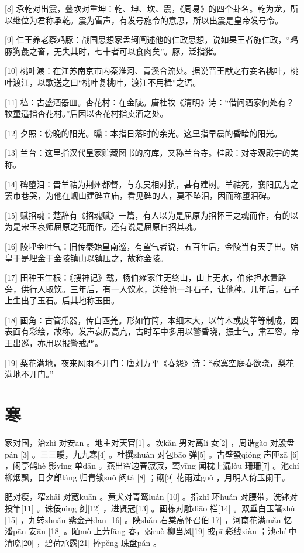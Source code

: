 \documentclass[12pt,UTF8]{ctexbook}
\begin{document}
[8] 承乾对出震，叠坎对重坤：乾、坤、坎、震，《周易》的四个卦名。乾为龙，所以继位为君称承乾。震为雷声，有发号施令的意思，所以出震是皇帝发号令。

[9] 仁王养老察鸡豚：战国思想家孟轲阐述他的仁政思想，说如果王者施仁政，“鸡豚狗彘之畜，无失其时，七十者可以食肉矣”。豚，泛指猪。

[10] 桃叶渡：在江苏南京市内秦淮河、青溪合流处。据说晋王献之有妾名桃叶，桃叶渡江，以歌送之曰“桃叶复桃叶，渡江不用楫”之语。

[11] 榼：古盛酒器皿。杏花村：在金陵。唐杜牧《清明》诗：“借问酒家何处有？牧童遥指杏花村。”后因以杏花村指卖酒之处。

[12] 夕照：傍晚的阳光。曛：本指日落时的余光。这里指早晨的昏暗的阳光。

[13] 兰台：这里指汉代皇家贮藏图书的府库，又称兰台寺。桂殿：对寺观殿宇的美称。

[14] 碑堕泪：晋羊祜为荆州都督，与东吴相对抗，甚有建树。羊祜死，襄阳民为之罢巿巷哭，为他在岘山建碑立庙，看见碑的人，莫不坠泪，因而称堕泪碑。

[15] 赋招魂：楚辞有《招魂赋》一篇，有人以为是屈原为招怀王之魂而作，有的以为是宋玉哀师屈原之死而作。还有说是屈原自招其魂。

[16] 陵埋金吐气：旧传秦始皇南巡，有望气者说，五百年后，金陵当有天子出。始皇于是埋金于金陵镇山以镇压之，故称金陵。

[17] 田种玉生根：《搜神记》载，杨伯雍家住无终山，山上无水，伯雍担水置路旁，供行人取饮。三年后，有一人饮水，送给他一斗石子，让他种。几年后，石子上生出了玉石。后其地称玉田。

[18] 画角：古管乐器，传自西羌。形如竹筒，本细末大，以竹木或皮革等制成，因表面有彩绘，故称。发声哀厉高亢，古时军中多用以警昏晓，振士气，肃军容。帝王出巡，亦用以报警戒严。

[19] 梨花满地，夜来风雨不开门：唐刘方平《春怨》诗：“寂寞空庭春欲晓，梨花满地不开门。”





\chapter{寒}


家对国，治zhì 对安ān 。地主对天官[1] 。坎kǎn 男对离lí 女[2] ，周诰gào 对殷盘pán [3] 。三三暖，九九寒[4] 。杜撰zhuàn 对包bāo 弹[5] 。古壁蛩qióng 声匝zā [6] ，闲亭鹤hè 影yǐng 单dān 。燕出帘边春寂寂，莺yīng 闻枕上漏lòu 珊珊[7] 。池chí 柳烟飘，日夕郎láng 归青锁suǒ 闼tà [8] ；砌[9] 花雨过guò ，月明人倚玉阑干。

肥对瘦，窄zhǎi 对宽kuān 。黄犬对青鸾luán [10] 。指zhǐ 环huán 对腰带，洗钵对投竿[11] 。诛佞nìng 剑[12] ，进贤冠[13] 。画栋对雕diāo 栏[14] 。双垂白玉箸zhù [15] ，九转zhuǎn 紫金丹dān [16] 。陕shǎn 右棠高怀召伯[17] ，河南花满mǎn 忆潘pān 安ān [18] 。陌mò 上芳fāng 春，弱ruò 柳当风[19] 披pī 彩线xiàn ；池chí 中清晓[20] ，碧荷承露[21] 捧pěng 珠盘pán 。
\end{document}
